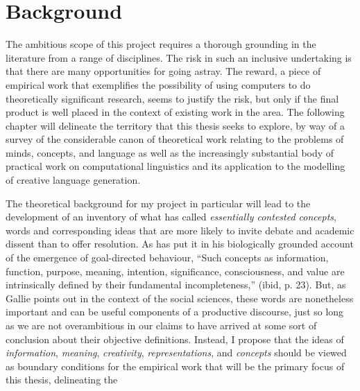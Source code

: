 \chapter{Background}
The ambitious scope of this project requires a thorough grounding in the literature from a range of disciplines.  The risk in such an inclusive undertaking is that there are many opportunities for going astray.  The reward, a piece of empirical work that exemplifies the possibility of using computers to do theoretically significant research, seems to justify the risk, but only if the final product is well placed in the context of existing work in the area.  The following chapter will delineate the territory that this thesis seeks to explore, by way of a survey of the considerable canon of theoretical work relating to the problems of minds, concepts, and language as well as the increasingly substantial body of practical work on computational linguistics and its application to the modelling of creative language generation.

The theoretical background for my project in particular will lead to the development of an inventory of what \cite{Gallie1956} has called \emph{essentially contested concepts}, words and corresponding ideas that are more likely to invite debate and academic dissent than to offer resolution.  As \cite{Deacon} has put it in his biologically grounded account of the emergence of goal-directed behaviour, ``Such concepts as information, function, purpose, meaning, intention, significance, consciousness, and value are intrinsically defined by their fundamental incompleteness,'' (ibid, p. 23).  But, as Gallie points out in the context of the social sciences, these words are nonetheless important and can be useful components of a productive discourse, just so long as we are not overambitious in our claims to have arrived at some sort of conclusion about their objective definitions.  Instead, I propose that the ideas of \emph{information}, \emph{meaning}, \emph{creativity}, \emph{representations}, and \emph{concepts} should be viewed as boundary conditions for the empirical work that will be the primary focus of this thesis, delineating the 

